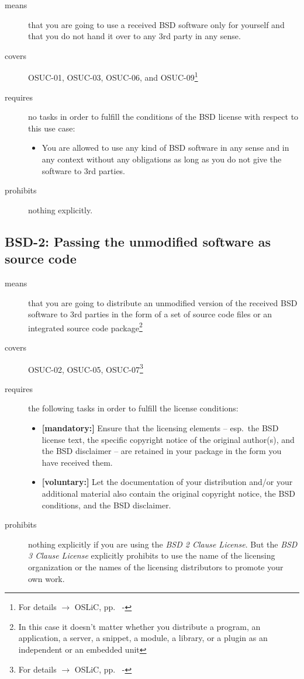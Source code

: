 \begin{description}
\item[means] that you are going to use a received BSD software only for yourself
and that you do not hand it over to any 3rd party in any sense.
\item[covers] OSUC-01, OSUC-03, OSUC-06, and OSUC-09\footnote{For details $\rightarrow$ OSLiC, pp.\
  \pageref{OSUC-01-DEF} - \pageref{OSUC-09-DEF}}
\item[requires] no tasks in order to fulfill the conditions of the BSD license
with respect to this use case:
  \begin{itemize}
    \item You are allowed to use any kind of BSD software in any sense and in
    any context without any obligations as long as you do not give the software
    to 3rd parties.
  \end{itemize}
\item[prohibits] nothing explicitly.
\end{description}


\subsection{BSD-2: Passing the unmodified software as source code}
\label{OSUC-02-BSD} \label{OSUC-05-BSD} \label{OSUC-07-BSD} 

\begin{description}
\item[means] that you are going to distribute an unmodified version of the
received BSD software to 3rd parties in the form of a set of source code files or an
integrated source code package\footnote{In this case it doesn't matter whether
you  distribute a program, an application, a server, a snippet, a module, a
library, or a plugin as an independent or an embedded unit}

\item[covers] OSUC-02, OSUC-05, OSUC-07\footnote{For details $\rightarrow$ OSLiC, pp.\ 
\pageref{OSUC-02-DEF} - \pageref{OSUC-07-DEF}}

\item[requires] the following tasks in order to fulfill the license conditions:
\begin{itemize}
  \item \textbf{[mandatory:]} Ensure that the licensing elements -- esp.\ the
  BSD license text, the specific copyright notice of the original author(s), and
  the BSD disclaimer -- are retained in your package in the form you have
  received them.
  \item \textbf{[voluntary:]} Let the documentation of your distribution
  and/or your additional material also contain the original copyright notice, the
  BSD conditions, and the BSD disclaimer.
\end{itemize}

\item[prohibits] nothing explicitly if you are using the \emph{BSD 2 Clause
License}. But the \emph{BSD 3 Clause License} explicitly prohibits to use the
name of the licensing organization or the names of the licensing distributors to
promote your own work.

\end{description}

